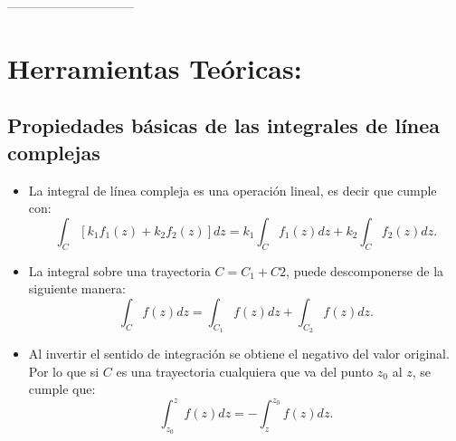 \documentclass[10pt,a4paper]{article}
\begin{document}
\begin{center}
	------------------------------
\end{center}


\section*{Herramientas Te\'oricas:}
\label{sec:herr}

\subsection*{Propiedades b\'asicas de las integrales de l\'inea complejas}
\begin{itemize}
	\item La integral de l\'inea compleja es una operaci\'on lineal, es decir 
	que cumple con:
	\begin{equation}
	\int_C [k_1f_1(z)+k_2f_2(z)]dz =k_1 \int_C f_1(z) dz + k_2\int_C f_2(z)dz.
	\label{eq:ht3}
	\end{equation}	
	\item La integral sobre una trayectoria $C=C_1+C2$, puede descomponerse de 
	la siguiente manera:
	\begin{equation}
	\int_C f(z) dz =\int_{C_1} f(z) dz + \int_{C_2} f(z)dz.
	\label{eq:ht4}
	\end{equation}
	\item Al invertir el sentido de integraci\'on se obtiene el negativo del 
	valor original. Por lo que si $C$ es una trayectoria cualquiera que va del 
	punto $z_0$ al $z$, se cumple que:
	\begin{equation}
	\int_{z_0}^{z} f(z) dz = - \int_{z}^{z_0} f(z) dz.
	\label{eq:ht5}
	\end{equation}				
\end{itemize}

\end{document}
